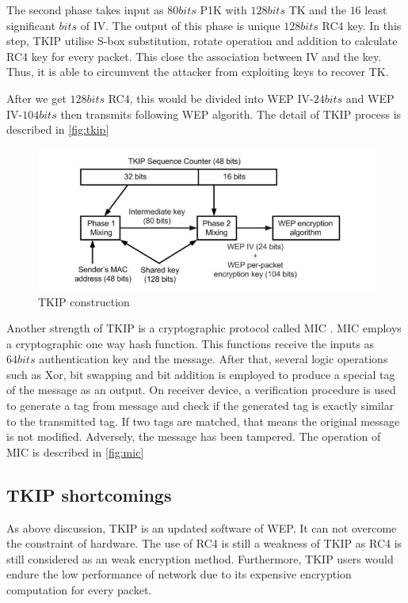 The second phase takes input as $80 bits$ \ac{P1K} with $128 bits$ \ac{TK} and the $16$ least significant $bits$ of \ac{IV}. The output of this phase is unique $128 bits$ \ac{RC4} key. In this step, \ac{TKIP} utilise S-box substitution, rotate operation and addition to calculate \ac{RC4} key for every packet. This close the association between \ac{IV} and the key. Thus, it is able to circumvent the attacker from exploiting  keys to recover \ac{TK}.

After we get $128 bits$ \ac{RC4}, this would be divided into \ac{WEP} \ac{IV}-$24 bits$ and \ac{WEP} \ac{IV}-$104 bits$ then transmits following \ac{WEP} algorith. The detail of \ac{TKIP} process is described in \autoref{fig:tkip} %

\begin{figure}
	\includegraphics[scale=0.45]{images/tkip.png}
	\caption{\ac{TKIP} construction}
	\label{fig:tkip}
\end{figure}

Another strength of \ac{TKIP} is a cryptographic protocol called \ac{MIC} \cite{1318903}. \ac{MIC} employs a cryptographic one way hash function. This functions receive the inputs as $64 bits$ authentication key and the message. After that, several logic operations such as \ac{Xor}, bit swapping and bit addition is employed to produce a special tag of the message as an output. On receiver device, a verification procedure is used to generate a tag from message and check if the generated tag is exactly similar to the transmitted tag. If two tags are matched, that means the original message is not modified. Adversely, the message has been tampered. The operation of \ac{MIC} is described in \autoref{fig:mic}  %



\subsection{TKIP shortcomings}
As above discussion, \ac{TKIP} is an updated software of \ac{WEP}. It can not overcome the constraint of hardware. The use of \ac{RC4} is still a weakness of \ac{TKIP} as \ac{RC4} is still considered as an weak encryption method. Furthermore, \ac{TKIP} users would endure the low performance of network due to its expensive encryption computation for every packet. 
